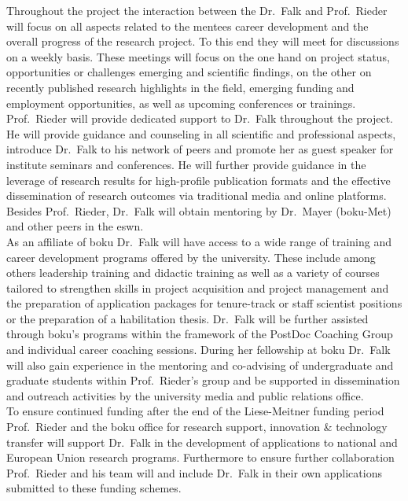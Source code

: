 Throughout the project the interaction between the Dr.~Falk and Prof.~Rieder will focus on all aspects related to the mentees career development and the overall progress of the research project. To this end they will meet for discussions on a weekly basis. These meetings will focus on the one hand on project status, opportunities or challenges emerging and scientific findings, on the other on recently published research highlights in the field, emerging funding and employment opportunities, as well as upcoming conferences or trainings. Prof.~Rieder will provide dedicated support to Dr.~Falk throughout the project. He will provide guidance and counseling in all scientific and professional aspects, introduce Dr.~Falk to his network of peers and promote her as guest speaker for institute seminars and conferences. He will further provide guidance in the leverage of research results for high-profile publication formats and the effective dissemination of research outcomes via traditional media and online platforms. Besides Prof.~Rieder, Dr.~Falk will obtain mentoring by Dr.~Mayer (\gls{boku}-Met) and other peers in the \gls{eswn}.\\

As an affiliate of \gls{boku} Dr.~Falk will have access to a wide range of training and career development programs offered by the university. These include among others leadership training and didactic training as well as a variety of courses tailored to strengthen skills in project acquisition and project management and the preparation of application packages for tenure-track or staff scientist positions or the preparation of a habilitation thesis. Dr.~Falk will be further assisted through \gls{boku}’s programs within the framework of the PostDoc Coaching Group and individual career coaching sessions. During her fellowship at \gls{boku} Dr.~Falk will also gain experience in the mentoring and co-advising of undergraduate and graduate students within Prof.~Rieder’s group and be supported in dissemination and outreach activities by the university media and public relations office.\\

To ensure continued funding after the end of the Liese-Meitner funding period Prof.~Rieder and the \gls{boku} office for research support, innovation \& technology transfer will support Dr.~Falk in the development of applications to national and European Union research programs. Furthermore to ensure further collaboration Prof.~Rieder and his team will and include Dr.~Falk in their own applications submitted to these funding schemes.
